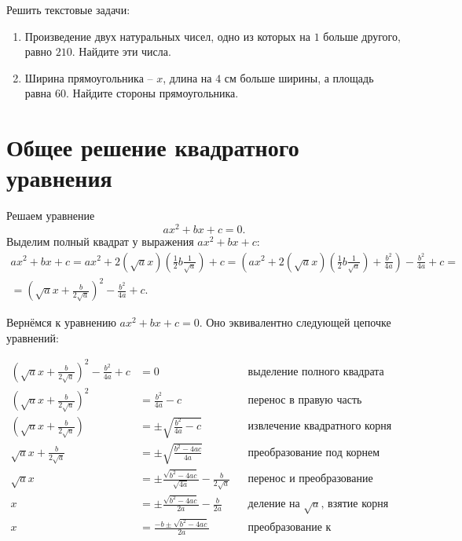 \documentclass[11pt,fleqn]{book} %
\begin{document}
\begin{problem}
Решить текстовые задачи:
\begin{enumerate}
\item Произведение двух натуральных чисел, одно из которых на $1$ больше другого, равно $210$. Найдите эти числа. 
\item Ширина прямоугольника – $x$, длина на $4$ см больше ширины, а площадь равна $60$. Найдите стороны прямоугольника. 
\end{enumerate}
\end{problem}

\section{Общее решение квадратного уравнения}
\label{sec:quad_gen}

Решаем уравнение $$ax^2+bx+c = 0.$$
Выделим полный квадрат у выражения $ax^2+bx+c$:
\begin{align*}
ax^2+bx+c = 
ax^2 + 2(\sqrt{a}x)\left(\frac{1}{2}b\frac{1}{\sqrt a}\right) + c = 
\left(ax^2 + 2\left(\sqrt{a}x\right)\left(\frac{1}{2}b\frac{1}{\sqrt a}\right) + \frac{b^2}{4a}\right) - \frac{b^2}{4a} + c = \\ = \left(\sqrt{a}x + \frac{b}{2\sqrt{a}}\right)^2 - \frac{b^2}{4a} + c .
\end{align*}

Вернёмся к уравнению $ax^2+bx+c = 0$. Оно эквивалентно следующей цепочке уравнений:

\begin{align*}
\left(\sqrt{a}x + \frac{b}{2\sqrt{a}}\right)^2 - \frac{b^2}{4a} + c &= 0 && \text{выделение полного квадрата} \\ 
\left(\sqrt{a}x + \frac{b}{2\sqrt{a}}\right)^2 &=  \frac{b^2}{4a} - c && 
\text{перенос в правую часть} \\ 
\left(\sqrt{a}x + \frac{b}{2\sqrt{a}}\right) &=  \pm \sqrt{\frac{b^2}{4a} - c} && 
\text{извлечение квадратного корня} \\ 
\sqrt{a}x + \frac{b}{2\sqrt{a}} &=  \pm \sqrt{\frac{b^2 - 4ac}{4a}} && 
\text{преобразование под корнем} \\ 
\sqrt{a}x &=  \pm {\frac{\sqrt{b^2 - 4ac}}{\sqrt{4a}}} - \frac{b}{2\sqrt{a}} && 
\text{перенос и преобразование дроби} \\ 
x &=  \pm {\frac{\sqrt{b^2 - 4ac}}{2a}} - \frac{b}{2a} && 
\text{деление на $\sqrt a$, взятие корня} \\ 
x &=  \frac{-b \pm {\sqrt{b^2 - 4ac}}}{2a} && 
\text{преобразование к классическому виду} 
\end{align*}
\end{document}
